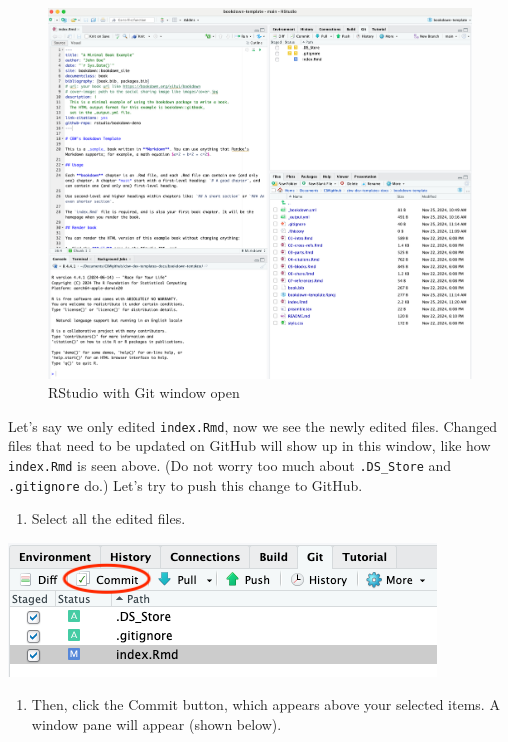 \documentclass[
]{book}
\providecommand{\tightlist}{%
  \setlength{\itemsep}{0pt}\setlength{\parskip}{0pt}}
\theoremstyle{definition}
\theoremstyle{definition}
\theoremstyle{definition}
\theoremstyle{definition}
\theoremstyle{remark}
\begin{document}
\begin{figure}
\centering
\includegraphics{img/git-instruct/RStudio-with-git-window-open.png}
\caption{RStudio with Git window open}
\end{figure}

Let's say we only edited \texttt{index.Rmd}, now we see the newly edited files. Changed files that need to be updated on GitHub will show up in this window, like how \texttt{index.Rmd} is seen above. (Do not worry too much about \texttt{.DS\_Store} and \texttt{.gitignore} do.) Let's try to push this change to GitHub.

\begin{enumerate}
\def\labelenumi{\arabic{enumi}.}
\setcounter{enumi}{12}
\tightlist
\item
  Select all the edited files.
\end{enumerate}

\includegraphics{img/git-instruct/git-window-selected-items.png}\\

\begin{enumerate}
\def\labelenumi{\arabic{enumi}.}
\setcounter{enumi}{13}
\tightlist
\item
  Then, click the Commit button, which appears above your selected items. A window pane will appear (shown below).
\end{enumerate}
\end{document}
